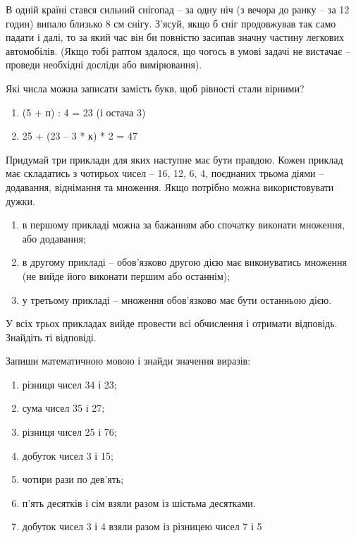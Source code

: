 \problem
В одній країні стався сильний снігопад – за одну ніч
(з вечора до ранку – за 12 годин) випало близько 8 см снігу.
З'ясуй, якщо б сніг продовжував так само падати і далі,
то за який час він би повністю засипав значну частину легкових автомобілів.
(Якщо тобі раптом здалося, що чогось в умові задачі не вистачає –
проведи необхідні досліди або вимірювання).


\problem
Які числа можна записати замість букв, щоб рівності стали вірними?
\begin{enumerate}
    \item (5 + п) : 4 = 23 (і остача 3)
    \item 25 + (23 – 3 * к) * 2 = 47
\end{enumerate}


\problem
Придумай три приклади для яких наступне має бути правдою.
Кожен приклад має складатись з чотирьох чисел – 16, 12, 6, 4,
поєднаних трьома діями – додавання, віднімання та множення.
Якщо потрібно можна використовувати дужки.
\begin{enumerate}
    \item в першому прикладі можна за бажанням або
    спочатку виконати множення, або додавання;
    \item в другому прикладі – обов'язково другою дією має
    виконуватись множення (не вийде його виконати першим або останнім);
    \item у третьому прикладі – множення обов'язково має бути останньою дією.
\end{enumerate}
У всіх трьох прикладах вийде провести всі обчислення і отримати відповідь. Знайдіть ті відповіді.


\problem
Запиши математичною мовою і знайди значення виразів:
\begin{enumerate}
    \item різниця чисел 34 і 23;
    \item сума чисел 35 і 27;
    \item різниця чисел 25 і 76;
    \item добуток чисел 3 і 15;
    \item чотири рази по дев'ять;
    \item п'ять десятків і сім взяли разом із шістьма десятками.
    \item добуток чисел 3 і 4 взяли разом із різницею чисел 7 і 5
\end{enumerate}


